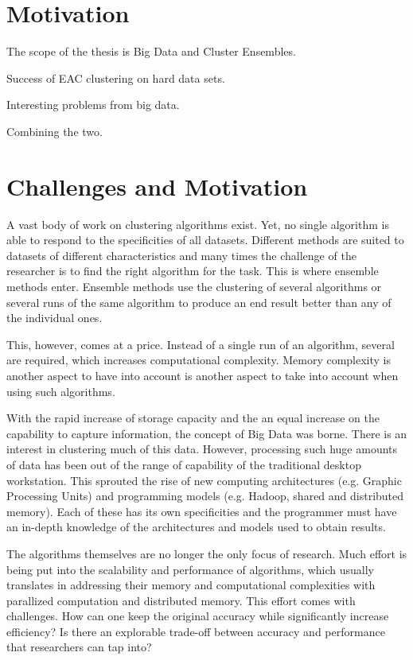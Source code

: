 \section{Motivation}
The scope of the thesis is Big Data and Cluster Ensembles.

Success of EAC clustering on hard data sets.

Interesting problems from big data.

Combining the two.

\section{Challenges and Motivation}

A vast body of work on clustering algorithms exist. Yet, no single algorithm is able to respond to the specificities of all datasets. Different methods are suited to datasets of different characteristics and many times the challenge of the researcher is to find the right algorithm for the task. This is where ensemble methods enter. Ensemble methods use the clustering of several algorithms or several runs of the same algorithm to produce an end result better than any of the individual ones.

This, however, comes at a price. Instead of a single run of an algorithm, several are required, which increases computational complexity. Memory complexity is another aspect to have into account is another aspect to take into account when using such algorithms.

With the rapid increase of storage capacity and the an equal increase on the capability to capture information, the concept of Big Data was borne. There is an interest in clustering much of this data. However, processing such huge amounts of data has been out of the range of capability of the traditional desktop workstation. This sprouted the rise of new computing architectures (e.g. Graphic Processing Units) and programming models (e.g. Hadoop, shared and distributed memory). Each of these has its own specificities and the programmer must have an in-depth knowledge of the architectures and models used to obtain results.

The algorithms themselves are no longer the only focus of research. Much effort is being put into the scalability and performance of algorithms, which usually translates in addressing their memory and computational complexities with parallized computation and distributed memory. This effort comes with challenges. How can one keep the original accuracy while significantly increase efficiency? Is there an explorable trade-off between accuracy and performance that researchers can tap into?


